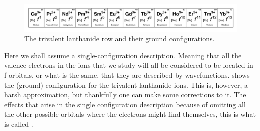 \documentclass[11pt, twoside,openright]{article}
\begin{document}
%    

\begin{figure}
\centering
\includegraphics[width=1.\textwidth]{./figures/theLanthanideRow.pdf}
\caption{The trivalent lanthanide row and their ground configurations.}
	\label{figure:tri-lanthanides-row}
\end{figure}


Here we shall assume a single-configuration description. Meaning that all the valence electrons in the ions that we study will all be considered to be located in f-orbitals, or what is the same, that they are described by \fn wavefunctions.  shows the (ground) configuration for the trivalent lanthanide ions. This is, however, a harsh approximation, but thankfully one can make some corrections to it. The effects that arise in the single configuration description because of omitting all the other possible orbitals where the electrons might find themselves, this is what is called \confint.  
\end{document}
